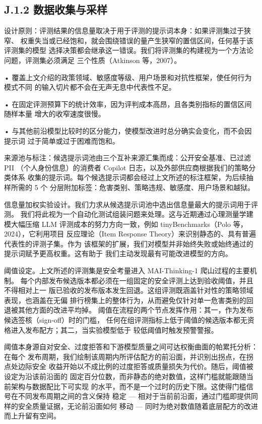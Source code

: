 \subsection{J.1.2 数据收集与采样}\label{j.1.2-data-collection-sampling}

设计原则：评测结果的信息量取决于用于评测的提示词本身：如果评测集过于狭窄、
权重失当或已经饱和，就会围绕错误的量产生狭窄的置信区间，任何基于该评测集的模型
选择决策都会继承这一错误。我们将评测集的构建视为一个方法论问题，评测集必须满足
三个性质（Atkinson 等，2007）。

• 覆盖上文介绍的政策领域、敏感度等级、用户场景和对抗性框架，使任何行为模式不同
的输入切片都不会在无声无息中代表性不足。

• 在固定评测预算下的统计效率，因为评判成本高昂，且各类别指标的置信区间随样本量
增大的收窄速度很慢。

• 与其他前沿模型比较时的区分能力，使模型改进时总分确实会变化，而不会因提示词
过于简单或过于困难而饱和。

来源池与标注：候选提示词池由三个互补来源汇集而成：公开安全基准、已过滤 PII
（个人身份信息）的消费者 Copilot 日志，以及外部供应商根据我们的策略分类体系
收集的提示词。每个候选提示词都会经过上文所述的标注框架，为后续抽样所需的 5 个
分层附加标签：危害类别、策略违规、敏感度、用户场景和越狱。

信息量加权实验设计。我们力求从候选提示词池中选出信息量最大的提示词用于评测。
我们将此视为一个自动化测试组装问题来处理。这与近期通过心理测量学建模大幅压缩
LLM 评测成本的努力方向一致，例如 tinyBenchmarks（Polo 等，2024），它利用项目
反应理论（Item Response Theory）来识别静态的、具有普遍代表性的评测子集。作为
该框架的扩展，我们对模型并非始终失败或始终通过的提示词赋予更高权重。这有助于
我们主动发现最有可能改进模型的方向。

阈值设定。上文所述的评测集是安全考量进入 MAI-Thinking-1 爬山过程的主要机制。
每个内部发布候选版本都必须在一组固定的安全评测上达到验收阈值，并且不得相对上一
版已验收的发布版本发生回退。这组评测既涵盖针对性的策略领域表现，也涵盖在无偏
排行榜集上的整体行为，从而避免仅针对单一危害类别的回退被其他方面的改进平均掉。
阈值在流程的两个节点发挥作用：其一，作为发布候选签核（sign-off）时的门槛，
任何在组评测指标上低于阈值的候选版本都无资格进入发布配方；其二，当实验模型低于
较低阈值时触发预警警报。

阈值本身源自对安全、过度拒答和下游模型质量之间可达权衡曲面的帕累托分析：在每个
发布周期，我们绘制该周期内所评估配方的前沿面，并识别出拐点，在拐点处边际安全
收益开始以不成比例的过度拒答或质量损失为代价。随后，阈值被设定为沿该前沿面的
固定百分位数，而非静态的绝对数值，这样门槛就能跟随当前架构与数据配比下可实现
的水平，而不是一个过时的历史下限。这使得门槛信号在不同发布周期之间的含义保持
稳定 --- 相对于当前前沿面，通过门槛即提供同样的安全质量证据，无论前沿面如何
移动 --- 同时为绝对数值随着底层配方的改进而上升留有空间。
